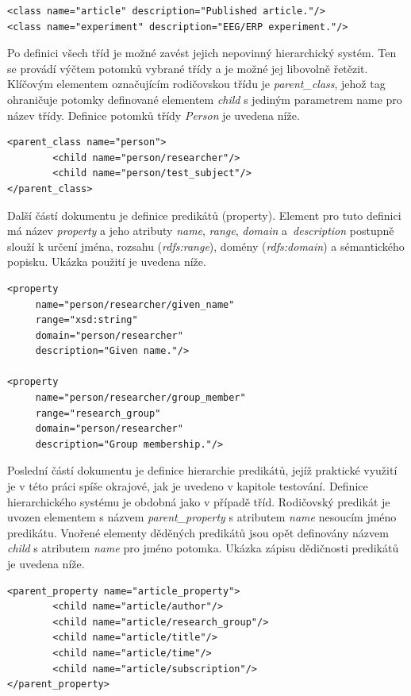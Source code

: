 \documentclass{projekt}
\begin{document}
\begin{verbatim}
<class name="article" description="Published article."/>    
<class name="experiment" description="EEG/ERP experiment."/>
\end{verbatim}

Po definici všech tříd je možné zavést jejich nepovinný hierarchický systém. Ten se provádí výčtem potomků vybrané třídy a je možné jej libovolně řetězit. Klíčovým elementem označujícím rodičovskou třídu je {\it parent\_class}, jehož tag ohraničuje potomky definované elementem {\it child} s jediným parametrem name pro název třídy. Definice potomků třídy {\it Person} je uvedena níže.

\begin{verbatim}
<parent_class name="person">
        <child name="person/researcher"/>
        <child name="person/test_subject"/>
</parent_class>
\end{verbatim}

Další částí dokumentu je definice predikátů (property). Element pro tuto definici má název {\it property} a jeho atributy {\it name}, {\it range}, {\it domain} a~{\it description} postupně slouží k určení jména, rozsahu ({\it rdfs:range}), domény ({\it rdfs:domain}) a sémantického popisku. Ukázka použití je uvedena níže.

\begin{verbatim}
<property 
     name="person/researcher/given_name" 
     range="xsd:string" 
     domain="person/researcher" 
     description="Given name."/>

<property 
     name="person/researcher/group_member" 
     range="research_group" 
     domain="person/researcher" 
     description="Group membership."/>
\end{verbatim}

Poslední částí dokumentu je definice hierarchie predikátů, jejíž praktické využití je v této práci spíše okrajové, jak je uvedeno v kapitole testování. Definice hierarchického systému je obdobná jako v případě tříd. Rodičovský predikát je uvozen elementem s názvem {\it parent\_property} s atributem {\it name} nesoucím jméno predikátu. Vnořené elementy děděných predikátů jsou opět definovány názvem {\it child} s atributem {\it name} pro jméno potomka. Ukázka zápisu dědičnosti predikátů je uvedena níže.

\begin{verbatim}
<parent_property name="article_property">
        <child name="article/author"/>
        <child name="article/research_group"/>
        <child name="article/title"/>
        <child name="article/time"/>
        <child name="article/subscription"/>
</parent_property>
\end{verbatim}
\end{document}
